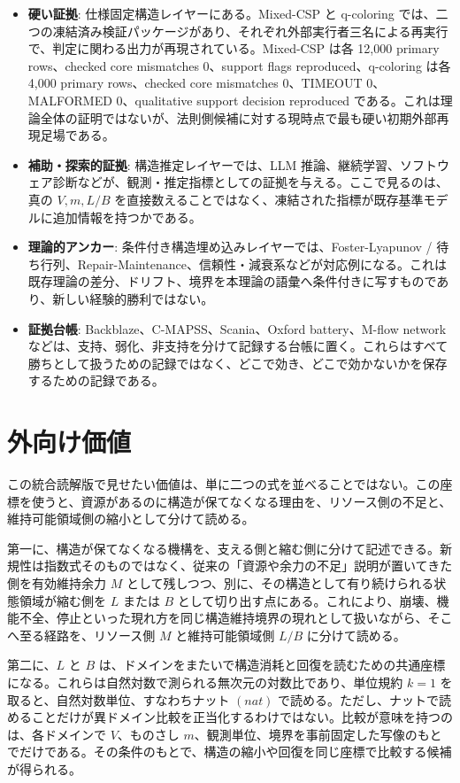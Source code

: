 \documentclass[12pt,a4paper]{article}
\begin{document}
\begin{itemize}
\tightlist
\item
  \textbf{硬い証拠}: 仕様固定構造レイヤーにある。Mixed-CSP と q-coloring では、二つの凍結済み検証パッケージがあり、それぞれ外部実行者三名による再実行で、判定に関わる出力が再現されている。Mixed-CSP は各 12,000 primary rows、checked core mismatches 0、support flags reproduced、q-coloring は各 4,000 primary rows、checked core mismatches 0、TIMEOUT 0、MALFORMED 0、qualitative support decision reproduced である。これは理論全体の証明ではないが、法則側候補に対する現時点で最も硬い初期外部再現足場である。
\item
  \textbf{補助・探索的証拠}: 構造推定レイヤーでは、LLM 推論、継続学習、ソフトウェア診断などが、観測・推定指標としての証拠を与える。ここで見るのは、真の \(V,m,L/B\) を直接数えることではなく、凍結された指標が既存基準モデルに追加情報を持つかである。
\item
  \textbf{理論的アンカー}: 条件付き構造埋め込みレイヤーでは、Foster-Lyapunov / 待ち行列、Repair-Maintenance、信頼性・減衰系などが対応例になる。これは既存理論の差分、ドリフト、境界を本理論の語彙へ条件付きに写すものであり、新しい経験的勝利ではない。
\item
  \textbf{証拠台帳}: Backblaze、C-MAPSS、Scania、Oxford battery、M-flow network などは、支持、弱化、非支持を分けて記録する台帳に置く。これらはすべて勝ちとして扱うための記録ではなく、どこで効き、どこで効かないかを保存するための記録である。
\end{itemize}

\section{外向け価値}\label{ux5916ux5411ux3051ux4fa1ux5024}

この統合読解版で見せたい価値は、単に二つの式を並べることではない。この座標を使うと、資源があるのに構造が保てなくなる理由を、リソース側の不足と、維持可能領域側の縮小として分けて読める。

第一に、構造が保てなくなる機構を、支える側と縮む側に分けて記述できる。新規性は指数式そのものではなく、従来の「資源や余力の不足」説明が置いてきた側を有効維持余力 \(M\) として残しつつ、別に、その構造として有り続けられる状態領域が縮む側を \(L\) または \(B\) として切り出す点にある。これにより、崩壊、機能不全、停止といった現れ方を同じ構造維持境界の現れとして扱いながら、そこへ至る経路を、リソース側 \(M\) と維持可能領域側 \(L/B\) に分けて読める。

第二に、\(L\) と \(B\) は、ドメインをまたいで構造消耗と回復を読むための共通座標になる。これらは自然対数で測られる無次元の対数比であり、単位規約 \(k=1\) を取ると、自然対数単位、すなわちナット \((nat)\) で読める。ただし、ナットで読めることだけが異ドメイン比較を正当化するわけではない。比較が意味を持つのは、各ドメインで \(V\)、ものさし \(m\)、観測単位、境界を事前固定した写像のもとでだけである。その条件のもとで、構造の縮小や回復を同じ座標で比較する候補が得られる。
\end{document}
